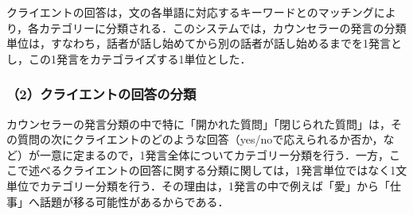 \documentclass[shuuron]{kuee}
\begin{document}






クライエントの回答は，文の各単語に対応するキーワードとのマッチングにより，各カテゴリーに分類される．このシステムでは，カウンセラーの発言の分類単位は，すなわち，話者が話し始めてから別の話者が話し始めるまでを1発言とし，この1発言をカテゴライズする1単位とした．







\subsubsection{（2）クライエントの回答の分類}



カウンセラーの発言分類の中で特に「開かれた質問」「閉じられた質問」は，その質問の次にクライエントのどのような回答（yes/noで応えられるか否か，など）が一意に定まるので，1発言全体についてカテゴリー分類を行う．一方，ここで述べるクライエントの回答に関する分類に関しては，1発言単位ではなく1文単位でカテゴリー分類を行う．その理由は，1発言の中で例えば「愛」から「仕事」へ話題が移る可能性があるからである．
\end{document}
